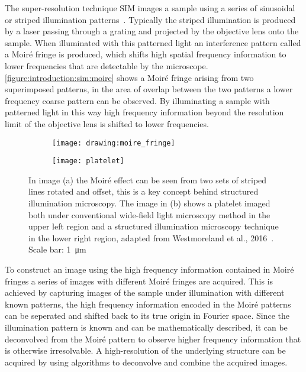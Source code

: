 The super-resolution technique SIM images a sample using a series of sinusoidal or striped illumination patterns~\cite{Gustafsson2000}. Typically the striped illumination is produced by a laser passing through a grating and projected by the objective lens onto the sample. When illuminated with this patterned light an interference pattern called a Moir\'e fringe is produced, which shifts high spatial frequency information to lower frequencies that are detectable by the microscope. \autoref{figure:introduction:sim:moire} shows a Moir\'e fringe arising from two superimposed patterns, in the area of overlap between the two patterns a lower frequency coarse pattern can be observed. By illuminating a sample with patterned light in this way high frequency information beyond the resolution limit of the objective lens is shifted to lower frequencies.

\begin{figure}[htbp!]\centering
\hspace*{\fill}
	\begin{subfigure}[b]{0.33\linewidth}
		\centering
		\texttt{[image: drawing:moire\_fringe]}
		\caption{}
		\label{figure:introduction:sim:moire}
	\end{subfigure}
	\hfill
	\begin{subfigure}[b]{0.33\linewidth}
		\centering
		\texttt{[image: platelet]}
		\caption{}
		\label{figure:introduction:sim:platelet}
	\end{subfigure}
\hspace*{\fill}
\caption[Structured illumination microscopy]{In image (a) the Moir\'e effect can be seen from two sets of striped lines rotated and offset, this is a key concept behind structured illumination microscopy. The image in (b) shows a platelet imaged both under conventional wide-field light microscopy method in the upper left region and a structured illumination microscopy technique in the lower right region, adapted from Westmoreland et al., 2016~\cite{Westmoreland2016}. Scale bar: \SI{1}{\micro\meter}}
\label{figure:sim}
\end{figure}

To construct an image using the high frequency information contained in Moir\'e fringes a series of images with different Moir\'e fringes are acquired. 
This is achieved by capturing images of the sample under illumination with different known patterns, the high frequency information encoded in the Moir\'e patterns can be seperated and shifted back to its true origin in Fourier space. Since the illumination pattern is known and can be mathematically described, it can be deconvolved from the Moir\'e pattern to observe higher frequency information that is otherwise irresolvable. A high-resolution of the underlying structure can be acquired by using algorithms to deconvolve and combine the acquired images.

